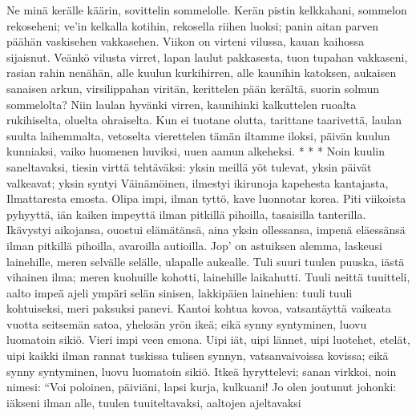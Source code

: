     Ne minä kerälle käärin,
    sovittelin sommelolle.
    Kerän pistin kelkkahani,
    sommelon rekoseheni;
    ve'in kelkalla kotihin,
    rekosella riihen luoksi;
    panin aitan parven päähän
    vaskisehen vakkasehen.
    Viikon on virteni vilussa,
    kauan kaihossa sijaisnut.
  \endverse
  \beginverse
    Veänkö vilusta virret,
    lapan laulut pakkasesta,
    tuon tupahan vakkaseni,
    rasian rahin nenähän,
    alle kuulun kurkihirren,
    alle kaunihin katoksen,
    aukaisen sanaisen arkun,
    virsilippahan viritän,
    kerittelen pään kerältä,
    suorin solmun sommelolta?
  \endverse
  \beginverse
    Niin laulan hyvänki virren,
    kaunihinki kalkuttelen
    ruoalta rukihiselta,
    oluelta ohraiselta.
    Kun ei tuotane olutta,
    tarittane taarivettä,
    laulan suulta laihemmalta,
    vetoselta vierettelen
    tämän iltamme iloksi,
    päivän kuulun kunniaksi,
    vaiko huomenen huviksi,
    uuen aamun alkeheksi.
    * * *
  \endverse
  \beginverse
    Noin kuulin saneltavaksi,
    tiesin virttä tehtäväksi:
    yksin meillä yöt tulevat,
    yksin päivät valkeavat;
    yksin syntyi Väinämöinen,
    ilmestyi ikirunoja
    kapehesta kantajasta,
    Ilmattaresta emosta.
  \endverse
  \beginverse
    Olipa impi, ilman tyttö,
    kave luonnotar korea.
    Piti viikoista pyhyyttä,
    iän kaiken impeyttä
    ilman pitkillä pihoilla,
    tasaisilla tanterilla.
    Ikävystyi aikojansa,
    ouostui elämätänsä,
    aina yksin ollessansa,
    impenä eläessänsä
  \endverse
  \beginverse
    ilman pitkillä pihoilla,
    avaroilla autioilla.
    Jop' on astuiksen alemma,
    laskeusi lainehille,
    meren selvälle selälle,
    ulapalle aukealle.
    Tuli suuri tuulen puuska,
    iästä vihainen ilma;
    meren kuohuille kohotti,
    lainehille laikahutti.
  \endverse
  \beginverse
    Tuuli neittä tuuitteli,
    aalto impeä ajeli
    ympäri selän sinisen,
    lakkipäien lainehien:
    tuuli tuuli kohtuiseksi,
    meri paksuksi panevi.
    Kantoi kohtua kovoa,
    vatsantäyttä vaikeata
    vuotta seitsemän satoa,
    yheksän yrön ikeä;
  \endverse
  \beginverse
    eikä synny syntyminen,
    luovu luomatoin sikiö.
    Vieri impi veen emona.
    Uipi iät, uipi lännet,
    uipi luotehet, etelät,
    uipi kaikki ilman rannat
    tuskissa tulisen synnyn,
    vatsanvaivoissa kovissa;
    eikä synny syntyminen,
    luovu luomatoin sikiö.
  \endverse
  \beginverse
    Itkeä hyryttelevi;
    sanan virkkoi, noin nimesi:
    ``Voi poloinen, päiviäni,
    lapsi kurja, kulkuani!
    Jo olen joutunut johonki:
    iäkseni ilman alle,
    tuulen tuuiteltavaksi,
    aaltojen ajeltavaksi
